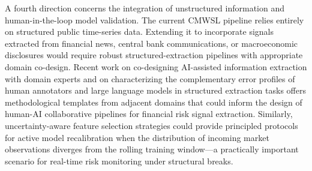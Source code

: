 A fourth direction concerns the integration of unstructured information and human-in-the-loop model validation. The current CMWSL pipeline relies entirely on structured public time-series data. Extending it to incorporate signals extracted from financial news, central bank communications, or macroeconomic disclosures would require robust structured-extraction pipelines with appropriate domain co-design. Recent work on co-designing AI-assisted information extraction with domain experts \cite{li2026endoextractcodesigningstructuredtext} and on characterizing the complementary error profiles of human annotators and large language models in structured extraction tasks \cite{li2026whofailswhere} offers methodological templates from adjacent domains that could inform the design of human-AI collaborative pipelines for financial risk signal extraction. Similarly, uncertainty-aware feature selection strategies \cite{li2025ougsactiveviewselection} could provide principled protocols for active model recalibration when the distribution of incoming market observations diverges from the rolling training window---a practically important scenario for real-time risk monitoring under structural breaks.

